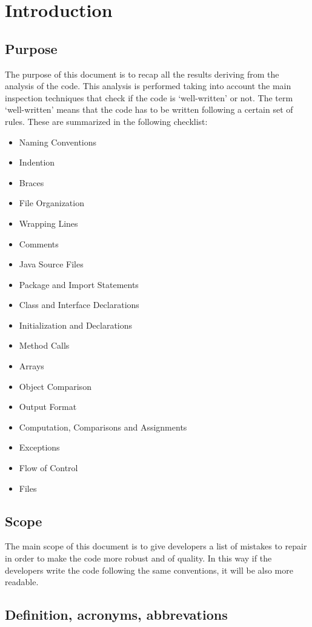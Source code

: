 \chapter{Introduction}

\section{Purpose}
The purpose of this document is to recap all the results deriving from the analysis of the code.
This analysis is performed taking into account the main inspection techniques that check if the code is ‘well-written’ or not.
The term ‘well-written’ means that the code has to be written following a certain set of rules.
These are summarized in the following checklist:
\begin{itemize}
\item Naming Conventions
\item Indention
\item Braces
\item File Organization
\item Wrapping Lines
\item Comments
\item Java Source Files
\item Package and Import Statements
\item Class and Interface Declarations
\item Initialization and Declarations
\item Method Calls
\item Arrays
\item Object Comparison
\item Output Format
\item Computation, Comparisons and Assignments
\item Exceptions
\item Flow of Control
\item Files
\end{itemize}

\section{Scope}
The main scope of this document is to give developers a list of mistakes to repair in order to make the code more robust and of quality.
In this way if the developers write the code following the same conventions, it will be also more readable.

\section{Definition, acronyms, abbrevations}

